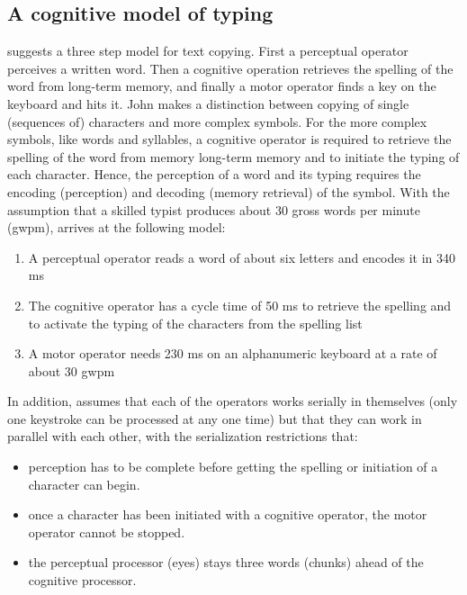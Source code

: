 \documentclass[output=paper]{LSP/langsci}
\begin{document}
\subsection{A cognitive model of typing}\label{sec:carl:3.1}
 
\citet{John1996} suggests a three step model for text copying. First a perceptual operator perceives a written word. Then a cognitive operation retrieves the spelling of the word from long-term memory, and finally a motor operator finds a key on the keyboard and hits it. John makes a distinction between copying of single (sequences of) characters and more complex symbols. For the more complex symbols, like words and syllables, a cognitive operator is required to retrieve the spelling of the word from memory long-term memory and to initiate the typing of each character. Hence,  the perception of a word and its typing requires the encoding (perception) and decoding (memory retrieval) of the symbol. With the assumption that a skilled typist produces about 30 gross words per minute (gwpm), \citeauthor{John1996} arrives at the following model:

\begin{enumerate}
\item A perceptual operator reads a word of about six letters and encodes it in 340 ms
\item The cognitive operator has a cycle time of 50 ms to retrieve the spelling and to activate the typing of the characters from the spelling list 
\item A motor operator needs 230 ms on an alphanumeric keyboard at a rate of about 30 gwpm 
\end{enumerate}

In addition, \citeauthor{John1996} assumes that each of the operators works serially in themselves (only one keystroke can be processed at any one time) but that they can work in parallel with each other, with the serialization restrictions that: 

\begin{itemize}
\item 
perception has to be complete before getting the spelling or initiation of a character can begin. 
\item 
once a character has been initiated with a cognitive operator, the motor operator cannot be stopped. 
\item 
the perceptual processor (eyes) stays three words (chunks) ahead of the cognitive processor. 
\end{itemize}
\end{document}
